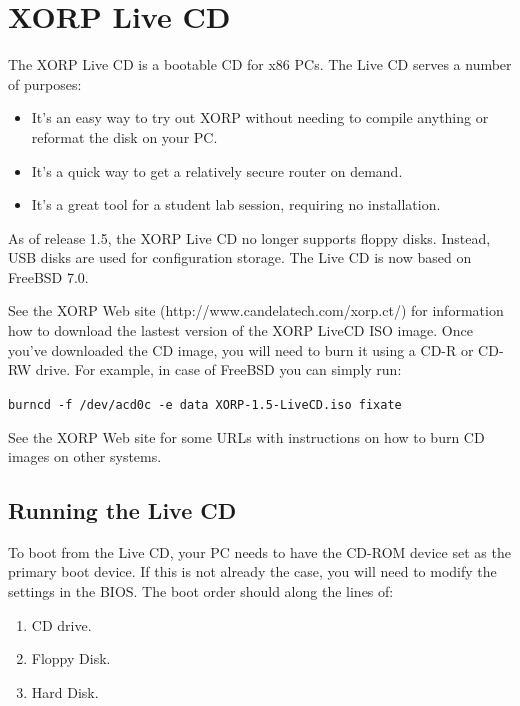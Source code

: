 %
%

\chapter{XORP Live CD}
\label{livecd}

The XORP Live CD is a bootable CD for x86 PCs.
The Live CD serves a number of purposes:

\begin{itemize}

  \item It's an easy way to try out XORP without needing to
  compile anything or reformat the disk on your PC.
  \item It's a quick way to get a relatively secure router on demand.
  \item It's a great tool for a student lab session, requiring no
  installation.

\end{itemize}

As of release 1.5, the XORP Live CD no longer supports floppy disks. Instead,
USB disks are used for configuration storage. The Live CD is now based on
FreeBSD 7.0.

See the XORP Web site ({\stt http://www.candelatech.com/xorp.ct/}) for information
how to download the lastest version of the XORP LiveCD ISO image.
Once you've downloaded the CD image, you will need to burn it using a
CD-R or CD-RW drive. For example, in case of FreeBSD you can simply run:

{\tt burncd -f /dev/acd0c -e data XORP-1.5-LiveCD.iso fixate}

See the XORP Web site for some URLs with instructions on how to burn CD images
on other systems.

\section{Running the Live CD}

To boot from the Live CD, your PC needs to have the CD-ROM device
set as the primary boot device.  If this is not already the case, you will
need to modify the settings in the BIOS.  The boot order should along the
lines of:

\begin{enumerate}
  \item CD drive.
  \item Floppy Disk.
  \item Hard Disk.
\end{enumerate}

